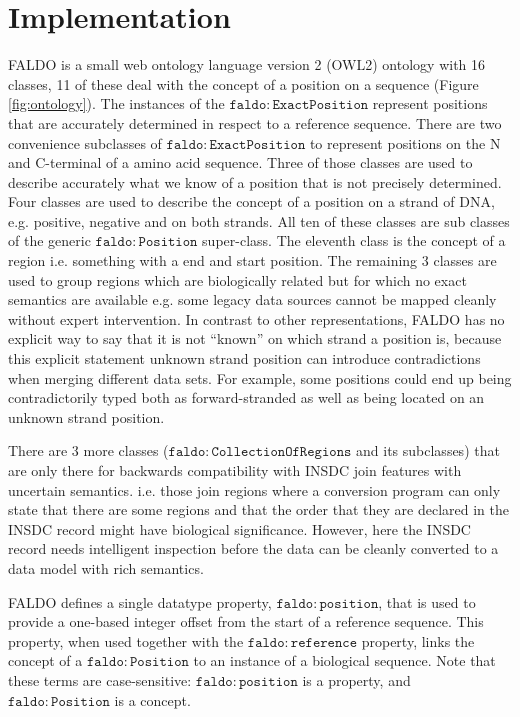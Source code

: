 \section*{Implementation}

FALDO is a small web ontology language version 2 (OWL2) ontology with 16 classes, 11 of these deal with the concept of a position on a sequence (Figure \ref{fig:ontology}).
The instances of the $\mathtt{faldo\colon{}ExactPosition}$ represent positions that are accurately determined in respect to a reference sequence. There are two convenience subclasses of $\mathtt{faldo\colon{}ExactPosition}$ to represent positions on the N and C-terminal of a amino acid sequence.
Three of those classes are used to describe accurately what we know of a position that is not precisely determined.
Four classes are used to describe the concept of a position on a strand of DNA, e.g. positive, negative and on both strands.
All ten of these classes are sub classes of the generic $\mathtt{faldo\colon{}Position}$ super-class.
The eleventh class is the concept of a region i.e. something with a end and start position.
The remaining 3 classes are used to group regions which are biologically related but for which no exact semantics are available e.g. some legacy data sources cannot be mapped cleanly without expert intervention.
In contrast to other representations, FALDO has no explicit way to say that it is not ``known'' on which strand a position is, because this explicit statement unknown strand position can introduce contradictions when merging different data sets.
For example, some positions could end up being contradictorily typed both as forward-stranded as well as being located on an unknown strand position.

There are 3 more classes ($\mathtt{faldo\colon{}CollectionOfRegions}$ and its subclasses) that are only there for backwards compatibility with INSDC join features with uncertain semantics. i.e. those join regions where a conversion program can only state that there are some regions and that the order that they are declared in the INSDC record might have biological significance.
However, here the INSDC record needs intelligent inspection before the data can be cleanly converted to a data model with rich semantics.

FALDO defines a single datatype property,
$\mathtt{faldo\colon{}position}$, that is used to provide a one-based
integer offset from the start of a reference sequence.
This property, when used together with the
$\mathtt{faldo\colon{}reference}$ property, links the concept of
a $\mathtt{faldo\colon{}Position}$ to an instance of a biological
sequence.
Note that these terms are case-sensitive:
$\mathtt{faldo\colon{}position}$ is a property, and
$\mathtt{faldo\colon{}Position}$ is a concept.



